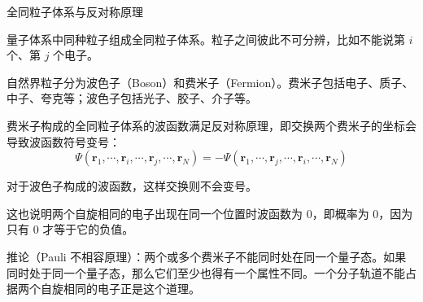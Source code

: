 全同粒子体系与反对称原理

量子体系中同种粒子组成全同粒子体系。粒子之间彼此不可分辨，比如不能说第 $i$ 个、第 $j$ 个电子。

自然界粒子分为波色子（Boson）和费米子（Fermion）。费米子包括电子、质子、中子、夸克等；波色子包括光子、胶子、介子等。

费米子构成的全同粒子体系的波函数满足反对称原理，即交换两个费米子的坐标会导致波函数符号变号：
\[
\Psi(\mathbf r_1,\cdots,\mathbf r_i,\cdots,\mathbf r_j,\cdots,\mathbf r_N)
=
-\Psi(\mathbf r_1,\cdots,\mathbf r_j,\cdots,\mathbf r_i,\cdots,\mathbf r_N)
\]

对于波色子构成的波函数，这样交换则不会变号。

这也说明两个自旋相同的电子出现在同一个位置时波函数为 $0$，即概率为 $0$，因为只有 $0$ 才等于它的负值。

推论（Pauli 不相容原理）：两个或多个费米子不能同时处在同一个量子态。如果同时处于同一个量子态，那么它们至少也得有一个属性不同。一个分子轨道不能占据两个自旋相同的电子正是这个道理。
